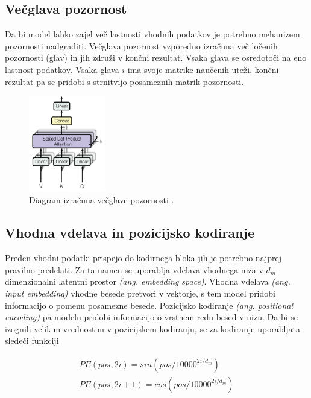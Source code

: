 \documentclass[a4paper,12pt,openright]{book}
\begin{document}
\subsection{Večglava pozornost}
Da bi model lahko zajel več lastnosti vhodnih podatkov je potrebno mehanizem pozornosti nadgraditi. Večglava pozornost vzporedno izračuna več ločenih pozornosti (glav) in jih združi v končni rezultat. Vsaka glava se osredotoči na eno lastnost podatkov. Vsaka glava $ i $ ima svoje matrike naučenih uteži, končni rezultat pa se pridobi s strnitvijo posameznih matrik pozornosti.

\begin{figure}[htb]
    \begin{center}
        \includegraphics[width=0.3\textwidth]{img/mha.png}
    \end{center}
    \caption{Diagram izračuna večglave pozornosti \cite{attention_is_all_you_need}.}
    \label{img:mha}
\end{figure}


\subsection{Vhodna vdelava in pozicijsko kodiranje}
Preden vhodni podatki prispejo do kodirnega bloka jih je potrebno najprej pravilno predelati. Za ta namen se uporablja vdelava vhodnega niza v $ d_m $ dimenzionalni latentni prostor \emph{(ang. embedding space)}. Vhodna vdelava \emph{(ang. input embedding)} vhodne besede pretvori v vektorje, s tem model pridobi informacijo o pomenu posamezne besede. Pozicijsko kodiranje \emph{(ang. positional encoding)} pa modelu pridobi informacijo o vrstnem redu besed v nizu. Da bi se izognili velikim vrednostim v pozicijskem kodiranju, se za kodiranje uporabljata sledeči funkciji

\begin{equation}
    \begin{split}
        PE(pos, 2i) = sin(pos/10000^{2i/d_m}) \\
        PE(pos, 2i+1) = cos(pos/10000^{2i/d_m})
    \end{split}
    \label{eq:7}
\end{equation}
\end{document}
